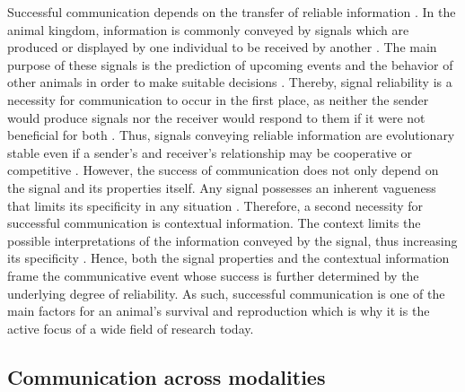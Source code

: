 Successful communication depends on the transfer of reliable information \parencite{endler1993some, searcy2010evolution, hebets2016systems}. In the animal kingdom, information is commonly conveyed by signals which are produced or displayed by one individual to be received by another \parencite{hebets2016systems, searcy2010evolution, seyfarth2010central}. The main purpose of these signals is the prediction of upcoming events and the behavior of other animals in order to make suitable decisions \parencite{endler1993some, seyfarth2010central}. Thereby, signal reliability is a necessity for communication to occur in the first place, as neither the sender would produce signals nor the receiver would respond to them if it were not beneficial for both \parencite{seyfarth2017origin}. Thus, signals conveying reliable information are evolutionary stable even if a sender's and receiver's relationship may be cooperative or competitive \parencite{seyfarth2017origin}. However, the success of communication does not only depend on the signal and its properties itself. Any signal possesses an inherent vagueness that limits its specificity in any situation \parencite{seyfarth2003signalers, seyfarth2017origin}. Therefore, a second necessity for successful communication is contextual information. The context limits the possible interpretations of the information conveyed by the signal, thus increasing its specificity \parencite{seyfarth2017origin}. Hence, both the signal properties and the contextual information frame the communicative event whose success is further determined by the underlying degree of reliability. As such, successful communication is one of the main factors for an animal's survival and reproduction which is why it is the active focus of a wide field of research today.

\subsection{Communication across modalities}

